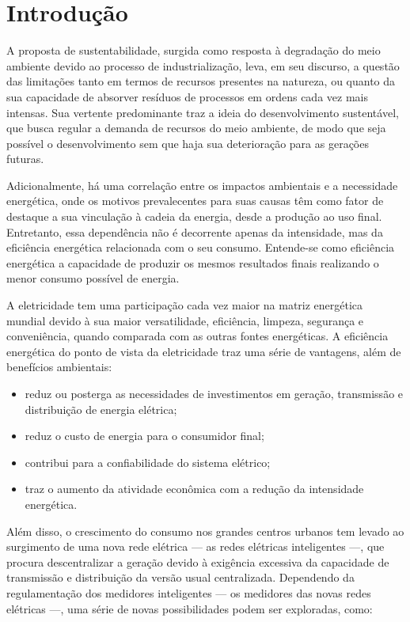 \chapter{Introdução}

A proposta de sustentabilidade, surgida como resposta à degradação do
meio ambiente devido ao processo de industrialização, leva, em seu
discurso, a questão das limitações tanto em termos de recursos
presentes na natureza, ou quanto da sua capacidade de absorver resíduos
de processos em ordens cada vez mais intensas. Sua vertente
predominante traz a ideia do desenvolvimento sustentável, que busca
regular a demanda de recursos do meio ambiente, de modo que seja
possível o desenvolvimento sem que haja sua deterioração para as
gerações futuras.

Adicionalmente, há uma correlação entre os impactos ambientais e a
necessidade energética, onde os motivos prevalecentes para suas
causas têm como fator de destaque a sua vinculação à cadeia da
energia, desde a produção ao uso final. Entretanto, essa dependência
não é decorrente apenas da intensidade, mas da eficiência energética
relacionada com o seu consumo. Entende-se como eficiência energética a
capacidade de produzir os mesmos resultados finais realizando o menor
consumo possível de energia.

A eletricidade tem uma participação cada vez maior na matriz
energética mundial devido à sua maior versatilidade, eficiência,
limpeza, segurança e conveniência, quando comparada com as outras
fontes energéticas. A eficiência energética do ponto de vista da
eletricidade traz uma série de vantagens, além de benefícios
ambientais:

\begin{itemize}
\item reduz ou posterga as necessidades de investimentos em geração, transmissão
e distribuição de energia elétrica;
\item reduz o custo de energia para o consumidor final;
\item contribui para a confiabilidade do sistema elétrico;
\item traz o aumento da atividade econômica com a redução da
intensidade energética.
\end{itemize}

Além disso, o crescimento do consumo nos grandes centros urbanos tem
levado ao surgimento de uma nova rede elétrica --- as redes elétricas
inteligentes ---, que procura descentralizar a geração devido à
exigência excessiva da capacidade de transmissão e distribuição da
versão usual centralizada. Dependendo da regulamentação dos medidores
inteligentes --- os medidores das novas redes elétricas ---, uma série
de novas possibilidades podem ser exploradas, como:

